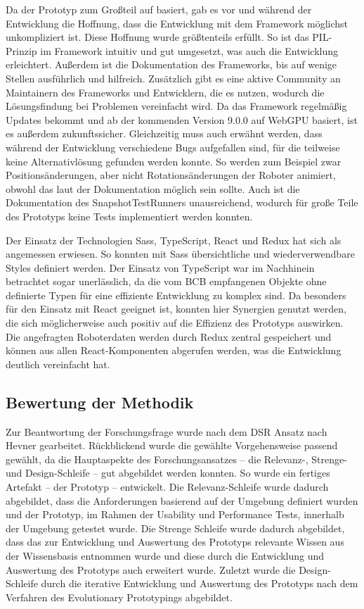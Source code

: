 Da der Prototyp zum Großteil auf \deckgl{} basiert, gab es vor und während der Entwicklung die Hoffnung, dass die Entwicklung mit dem Framework möglichst unkompliziert ist. Diese Hoffnung wurde größtenteils erfüllt. So ist das \ac{PIL}-Prinzip im Framework intuitiv und gut umgesetzt, was auch die Entwicklung erleichtert. Außerdem ist die Dokumentation des Frameworks, bis auf wenige Stellen ausführlich und hilfreich. Zusätzlich gibt es eine aktive Community an Maintainern des Frameworks und Entwicklern, die es nutzen, wodurch die Lösungsfindung bei Problemen vereinfacht wird. Da das Framework regelmäßig Updates bekommt und ab der kommenden Version 9.0.0 auf WebGPU basiert, ist es außerdem zukunftssicher. Gleichzeitig muss auch erwähnt werden, dass während der Entwicklung verschiedene Bugs aufgefallen sind, für die teilweise keine Alternativlösung gefunden werden konnte. So werden zum Beispiel zwar Positionsänderungen, aber nicht Rotationsänderungen der Roboter animiert, obwohl das laut der Dokumentation möglich sein sollte. Auch ist die Dokumentation des SnapshotTestRunners unausreichend, wodurch für große Teile des Prototyps keine Tests implementiert werden konnten.

Der Einsatz der Technologien \ac{Sass}, TypeScript, React und Redux hat sich als angemessen erwiesen. So konnten mit \ac{Sass} übersichtliche und wiederverwendbare Styles definiert werden. Der Einsatz von TypeScript war im Nachhinein betrachtet sogar unerlässlich, da die vom \ac{BCB} empfangenen Objekte ohne definierte Typen für eine effiziente Entwicklung zu komplex sind. Da \deckgl{} besonders für den Einsatz mit React geeignet ist, konnten hier Synergien genutzt werden, die sich möglicherweise auch positiv auf die Effizienz des Prototyps auswirken. Die angefragten Roboterdaten werden durch Redux zentral gespeichert und können aus allen React-Komponenten abgerufen werden, was die Entwicklung deutlich vereinfacht hat.

\subsection{Bewertung der Methodik}
Zur Beantwortung der Forschungsfrage wurde nach dem \ac{DSR} Ansatz nach Hevner \cite{Hevner2004} gearbeitet. Rückblickend wurde die gewählte Vorgehensweise passend gewählt, da die Hauptaspekte des Forschungsansatzes – die Relevanz-, Strenge- und Design-Schleife – gut abgebildet werden konnten. So wurde ein fertiges Artefakt – der Prototyp – entwickelt. Die Relevanz-Schleife wurde dadurch abgebildet, dass die Anforderungen basierend auf der Umgebung definiert wurden und der Prototyp, im Rahmen der Usability und Performance Tests, innerhalb der Umgebung getestet wurde. Die Strenge Schleife wurde dadurch abgebildet, dass das zur Entwicklung und Auswertung des Prototyps relevante Wissen aus der Wissensbasis entnommen wurde und diese durch die Entwicklung und Auswertung des Prototyps auch erweitert wurde. Zuletzt wurde die Design-Schleife durch die iterative Entwicklung und Auswertung des Prototyps nach dem Verfahren des Evolutionary Prototypings abgebildet.

